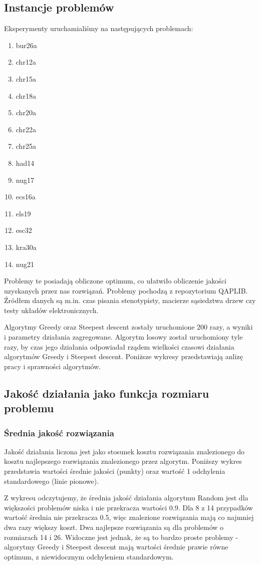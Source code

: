\documentclass[a4paper,10pt]{article}
\begin{document}
\subsection{Instancje problemów}
Eksperymenty uruchamialiśmy na następujących problemach:
\begin{enumerate}
\item bur26a
\item chr12a
\item chr15a
\item chr18a
\item chr20a
\item chr22a
\item chr25a
\item had14
\item nug17
\item ecs16a
\item els19
\item esc32
\item kra30a
\item nug21
\end{enumerate}
Problemy te posiadają obliczone optimum, co ułatwiło obliczenie jakości uzyskanych przez nas rozwiązań.
Problemy pochodzą z repozytorium QAPLIB.
Źródłem danych są m.in. czas pisania stenotypisty, macierze sąsiedztwa drzew czy testy układów elektronicznych.

Algorytmy Greedy oraz Steepest descent zostały uruchomione 200 razy, a wyniki i parametry działania zagregowane. 
Algorytm losowy został uruchomiony tyle razy, by czas jego działania odpowiadał rządem wielkości czasowi działania algorytmów Greedy i Steepest descent.
Poniższe wykresy przedstawiają anlizę pracy i sprawności algorytmów.
\subsection{Jakość działania jako funkcja rozmiaru problemu}
\subsubsection{Średnia jakość rozwiązania}
Jakość działania liczona jest jako stosunek kosztu rozwiązania znalezionego do kosztu najlepszego rozwiązania znalezionego przez algorytm.
Poniższy wykres przedstawia wartości średnie jakości (punkty) oraz wartość 1 odchylenia standardowego (linie pionowe).
\begin{center}

\end{center}
Z wykresu odczytujemy, że średnia jakość działania algorytmu Random jest dla większości problemów niska i nie przekracza wartości 0.9.  
Dla 8 z 14 przypadków wartość średnia nie przekracza 0.5, więc znalezione rozwiązania mają co najmniej dwa razy większy koszt.
Dwa najlepsze rozwiązania są dla problemów o rozmiarach 14 i 26.
Widoczne jest jednak, że są to bardzo proste problemy - algorytmy Greedy i Steepest descent mają wartości średnie prawie równe optimum, z niewidocznym odchyleniem standardowym.
\end{document}
